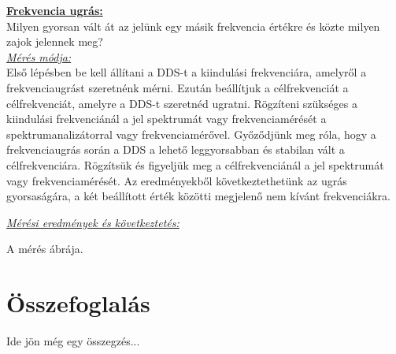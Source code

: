 \documentclass[a4paper,12pt]{article}
\begin{document}
		\textbf{\underline{Frekvencia ugrás:}}\\
		Milyen gyorsan vált át az jelünk egy másik frekvencia értékre és közte milyen zajok jelennek meg?\\
		\textit{\underline{Mérés módja:}}\\
		Első lépésben be kell állítani a DDS-t a kiindulási frekvenciára, amelyről a frekvenciaugrást szeretnénk mérni.
		Ezután beállítjuk a célfrekvenciát a célfrekvenciát, amelyre a DDS-t szeretnéd ugratni. 
		Rögzíteni szükséges a kiindulási frekvenciánál a jel spektrumát vagy frekvenciamérését a spektrumanalizátorral vagy frekvenciamérővel.
		Győződjünk meg róla, hogy a frekvenciaugrás során a DDS a lehető leggyorsabban és stabilan vált a célfrekvenciára.
		Rögzítsük és figyeljük meg a célfrekvenciánál a jel spektrumát vagy frekvenciamérését.
		Az eredményekből következtethetünk az ugrás gyorsaságára, a két beállított érték közötti megjelenő nem kívánt frekvenciákra.
		
		\textit{\underline{Mérési eredmények és következtetés:}}\\
		
		\begin{center}
			A mérés ábrája.
		\end{center}
	\newpage
	\section{Összefoglalás}\label{sec:Összefoglaló}
	Ide jön még egy összegzés...
	\newpage
	
	\clearpage
	\renewcommand{\bibsection}{\section*{\bibname}}
	
\end{document}
